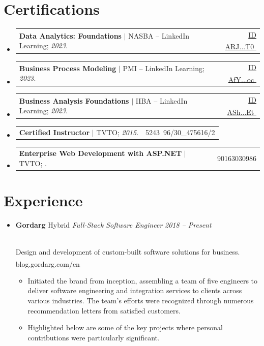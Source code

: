 \documentclass[11pt,a4paper]{article}
\makeatletter
\let\orighref\href
\renewcommand{\href}[2]{\orighref{#1}{#2\,{\textsuperscript{\tiny{\textcolor{heritagered}{\faExternalLink}}}}}}
\newcommand{\deemph}[1]{{\color{gray}#1}}
\newcommand{\info}[1]{
    \\
    \deemph{
        \faInfoCircle
        \hspace{0.15in}
         #1
     }
     \vspace{-7pt}
}
\newcommand{\resumeItem}[1]{
  \item\small{
    {#1 \vspace{-2pt}}
  }
}
\newcommand{\resumeSubheading}[4]{
  \vspace{-2pt}\item
      \textbf{#1} \small\deemph{#2}
      \textit{\small #3} \hfill \textit{\small\deemph{\textcolor{marineblue}{#4}}}
    \vspace{0pt}
}
\newcommand{\resumeProjectHeading}[2]{
    \item
    \begin{tabular*}{0.97\textwidth}{l@{\extracolsep{\fill}}r}
      \small#1 & \deemph{#2} \\
    \end{tabular*}\vspace{-7pt}
}
\newcommand{\resumeSubHeadingListStart}{\begin{itemize}[leftmargin=0.15in, label={}]}
\newcommand{\resumeSubHeadingListEnd}{\end{itemize}}
\newcommand{\resumeItemListStart}{\begin{itemize}}
\newcommand{\resumeItemListEnd}{\end{itemize}\vspace{-5pt}}
\makeatother
\begin{document}
\section{Certifications}
    \resumeSubHeadingListStart
      \resumeProjectHeading
          {\textbf{Data Analytics: Foundations} $|$ NASBA -- LinkedIn Learning; \emph{2023}.}{\href{https://www.linkedin.com/learning/certificates/10c24841aac6b0c139f4971a8efd6d10356dc105124e31fa10eb32aa14ce3392}{\deemph{ID} \small{ARJ...T0}}}
      \resumeProjectHeading
          {\textbf{Business Process Modeling} $|$ PMI -- LinkedIn Learning; \emph{2023}.}{\href{https://www.linkedin.com/learning/certificates/3d1e244d9234631a908175486d19855434634d7f61cec316326ba4eb269bb041}{\deemph{ID} \small{AfY...oc}}}
      \resumeProjectHeading
          {\textbf{Business Analysis Foundations} $|$ IIBA -- LinkedIn Learning; \emph{2023}.}{\href{https://www.linkedin.com/learning/certificates/51dd265ef63b58255245c8f7438549551c92d30031e81b9ad864ee6994e1f6e6}{\deemph{ID} \small{ASh...Et}}}
       \resumeProjectHeading
           {\textbf{Certified Instructor} $|$ TVTO; \emph{2015}.}{\deemph{Contract No.} 5243\, 96/30\_475616/2}
     \resumeProjectHeading
           {\textbf{Enterprise Web Development with ASP.NET} $|$ TVTO; \emph{\highlight{2013}}.}{\deemph{No.} 90163030986}
    \resumeSubHeadingListEnd

\section{Experience}
  \resumeSubHeadingListStart
    \resumeSubheading
        {Gordarg}{Hybrid}
        {Full-Stack Software Engineer}{2018 -- Present}
        \info{Design and development of custom-built software solutions for business. \href{https://blog.gordarg.com/en}{blog.gordarg.com/en}}
        \resumeItemListStart
            \resumeItem{Initiated the brand from inception, assembling a team of five engineers to deliver software engineering and integration services to \highlight{50\textsuperscript{+}} clients across various industries. The team’s efforts were recognized through numerous recommendation letters from satisfied customers.}
            \resumeItem{Highlighted below are some of the key projects where personal contributions were particularly significant.}
          \resumeItemListEnd
  \resumeSubHeadingListEnd
  
\end{document}
